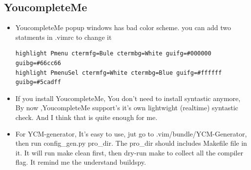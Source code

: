 \documentclass[a4paper,12pt,twoside]{book}
\begin{document}
\subsection{YoucompleteMe}
\begin{itemize}
\item YoucompleteMe popup windows has bad color scheme. you can add two statments in .vimrc to change it 
\begin{verbatim}
highlight Pmenu ctermfg=Bule ctermbg=White guifg=#000000 guibg=#66cc66
highlight PmenuSel ctermfg=White ctermbg=Blue guifg=#ffffff guibg=#5cadff
\end{verbatim}

\item If you install YoucompleteMe, You don't need to install syntastic anymore, By now ,YoucompleteMe support's it's own lightwight (realtime) syntastic check. And I think that is quite enough for me.  

\item For YCM-generator, It's easy to use, jut go to .vim/bundle/YCM-Generator, then run config\_gen.py pro\_dir. The pro\_dir should includes Makefile file in it.  It will run make clean first, then dry-run make to collect all the compiler flag. It remind me the understand buildspy. 

\end{itemize}
\end{document}
